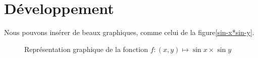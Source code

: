 \chapter{Développement}

Nous pouvons insérer de beaux graphiques, comme celui de la
figure\vref{sin-x*sin-y}.
\begin{figure}[ht]
  \centering
  \capstart
  \caption{Représentation graphique de la fonction $f:(x,y)\mapsto
    \sin x\times\sin y$}
  \label{sin-x*sin-y}
\end{figure}

\lipsum[3-10]

